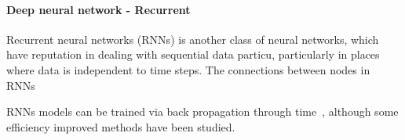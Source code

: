 \paragraph{Deep neural network - Recurrent}
Recurrent neural networks (RNNs) is another class of neural networks, which have reputation in dealing with sequential data particu, particularly in places where data is independent to time steps. The connections between nodes in RNNs 


RNNs models can be trained via back propagation through time~\cite{Goodfellow-et-al-2016}, although some efficiency improved methods have been studied.~\cite{963769,neco.1989,Gomez:2008:ANE:1390681.1390712}
